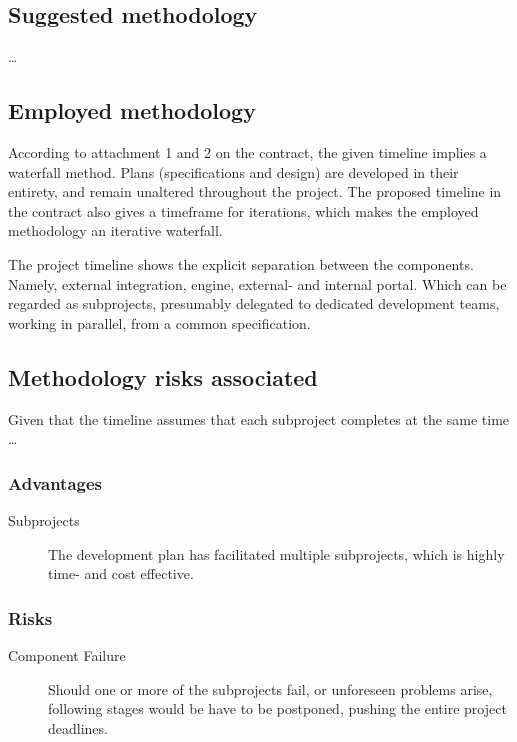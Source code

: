 \documentclass[11pt]{article}
\begin{document}
\subsection{Suggested methodology}
\label{sec:B|sub:suggested-method}

\dots

\subsection{Employed methodology}
\label{sec:B|sub:employed-method}
According to attachment 1 and 2 on the contract, the given timeline implies a waterfall method. Plans (specifications and design) are developed in their entirety, and remain unaltered throughout the project. The proposed timeline in the contract also gives a timeframe for iterations, which makes the employed methodology an iterative waterfall.

The project timeline shows the explicit separation between the components. Namely, external integration, engine, external- and internal portal. Which can be regarded as subprojects, presumably delegated to dedicated development teams, working in parallel, from a common specification.

\subsection{Methodology risks associated}
\label{sec:B|sub:risks}
Given that the timeline assumes that each subproject completes at the same time \dots

\subsubsection{Advantages}
\label{sec:B|sub:risks|sub:advantages}
\begin{description}
    \item[Subprojects] The development plan has facilitated multiple subprojects, which is highly time- and cost effective.
\end{description}

\subsubsection{Risks}
\label{sec:B|sub:risks|sub:risks}
\begin{description}
    \item[Component Failure] Should one or more of the subprojects fail, or unforeseen problems arise, following stages would be have to be postponed, pushing the entire project deadlines.
\end{description}
\end{document}
